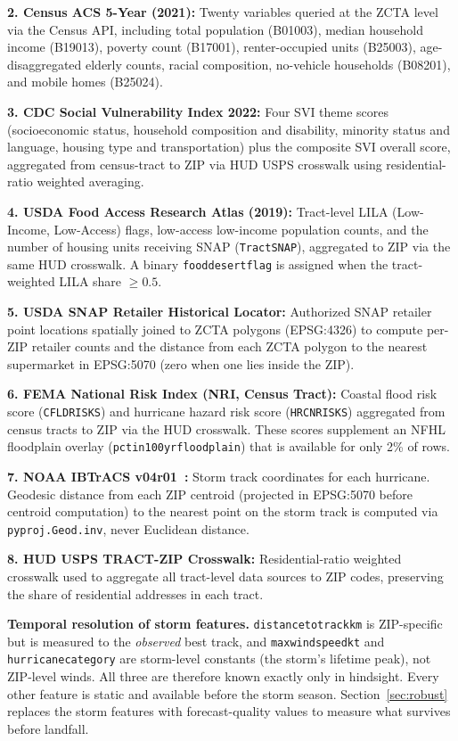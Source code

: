 \documentclass[conference]{IEEEtran}
\renewcommand{\_}{\origunderscore\allowbreak}
\begin{document}
\textbf{2. Census ACS 5-Year (2021):}
Twenty variables queried at the ZCTA level via the Census API,
including total population (B01003), median household income
(B19013), poverty count (B17001), renter-occupied units (B25003),
age-disaggregated elderly counts, racial composition, no-vehicle
households (B08201), and mobile homes (B25024).

\textbf{3. CDC Social Vulnerability Index 2022:}
Four SVI theme scores (socioeconomic status, household
composition and disability, minority status and language,
housing type and transportation) plus the composite SVI overall
score, aggregated from census-tract to ZIP via HUD USPS crosswalk
using residential-ratio weighted averaging.

\textbf{4. USDA Food Access Research Atlas (2019):}
Tract-level LILA (Low-Income, Low-Access) flags, low-access
low-income population counts, and the number of housing units
receiving SNAP (\texttt{TractSNAP}), aggregated to ZIP via the
same HUD crosswalk. A binary \texttt{food\_desert\_flag} is
assigned when the tract-weighted LILA share $\geq 0.5$.

\textbf{5. USDA SNAP Retailer Historical Locator:}
Authorized SNAP retailer point locations spatially joined to ZCTA
polygons (EPSG:4326) to compute per-ZIP retailer counts and the
distance from each ZCTA polygon to the nearest supermarket in
EPSG:5070 (zero when one lies inside the ZIP).

\textbf{6. FEMA National Risk Index (NRI, Census Tract):}
Coastal flood risk score (\texttt{CFLD\_RISKS}) and hurricane
hazard risk score (\texttt{HRCN\_RISKS}) aggregated from census
tracts to ZIP via the HUD crosswalk. These scores supplement an
NFHL floodplain overlay (\texttt{pct\_in\_100yr\_floodplain}) that
is available for only 2\% of rows.

\textbf{7. NOAA IBTrACS v04r01~\cite{knapp_ibtracs}:}
Storm track coordinates for each hurricane. Geodesic distance
from each ZIP centroid (projected in EPSG:5070 before centroid
computation) to the nearest point on the storm track is computed
via \texttt{pyproj.Geod.inv}, never Euclidean distance.

\textbf{8. HUD USPS TRACT-ZIP Crosswalk:}
Residential-ratio weighted crosswalk used to aggregate all
tract-level data sources to ZIP codes, preserving the share of
residential addresses in each tract.

\textbf{Temporal resolution of storm features.}
\texttt{distance\_to\_track\_km} is ZIP-specific but is measured
to the \textit{observed} best track, and \texttt{max\_wind\_speed\_kt}
and \texttt{hurricane\_category} are storm-level constants (the
storm's lifetime peak), not ZIP-level winds. All three are
therefore known exactly only in hindsight. Every other feature
is static and available before the storm season.
Section~\ref{sec:robust} replaces the storm features with
forecast-quality values to measure what survives before landfall.
\end{document}
